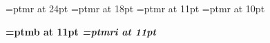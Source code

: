 
\pdfpagewidth=8.5in
\pdfpageheight=11in

\hoffset=-0.25in
\voffset=-0.25in
\vsize=9.50in
\hsize=7.00in

\baselineskip=12pt



\font\large=ptmr at 24pt
\font\medium=ptmr at 18pt
\font\small=ptmr at 11pt
\font\tiny=ptmr at 10pt

\font\bf=ptmb at 11pt
\font\it=ptmri at 11pt

\newdimen\center
\newbox\textbox
\newdimen\centertext




\def\centered#1{

    \center=\hsize
    \divide \center by 2

    \noindent\hbox{#1}\setbox\textbox\lastbox

    \centertext=\wd\textbox
    \divide \centertext by 2

    \advance \center by -\centertext

    \noindent\hskip\center #1
}




\def\section#1{
    \begingroup
    \vskip 5mm \noindent \tiny #1 \vskip 1mm \hrule \vskip 2mm
    \endgroup
}




\long{}




\long{}




\def\publisting#1{
    \begingroup
    \parindent=0mm
    \hangindent=10mm
    #1
    \vskip 1mm
    \endgroup
}